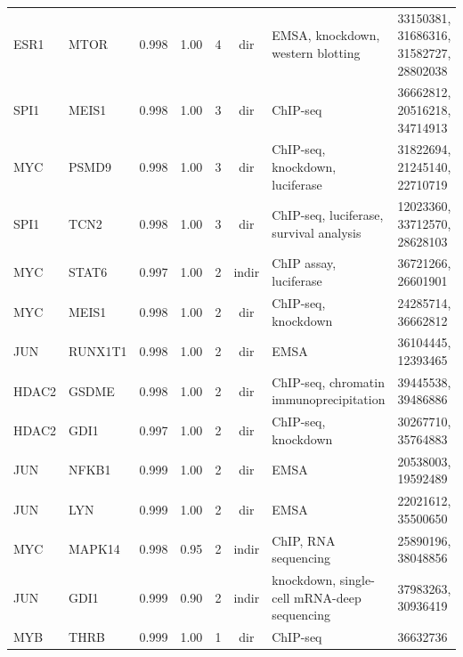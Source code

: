 \documentclass{article}
\begin{document}
\begin{longtable}{llccccP{4.2cm}P{5.8cm}}
ESR1   & MTOR    & 0.998 & 1.00 & 4  & dir   & EMSA, knockdown, western blotting                                              & 33150381, 31686316, 31582727, 28802038 \\
SPI1   & MEIS1   & 0.998 & 1.00 & 3  & dir   & ChIP-seq                                                                       & 36662812, 20516218, 34714913 \\
MYC    & PSMD9   & 0.998 & 1.00 & 3  & dir   & ChIP-seq, knockdown, luciferase                                                & 31822694, 21245140, 22710719 \\
SPI1   & TCN2    & 0.998 & 1.00 & 3  & dir   & ChIP-seq, luciferase, survival analysis                                        & 12023360, 33712570, 28628103 \\
MYC    & STAT6   & 0.997 & 1.00 & 2  & indir & ChIP assay, luciferase                                                         & 36721266, 26601901 \\
MYC    & MEIS1   & 0.998 & 1.00 & 2  & dir   & ChIP-seq, knockdown                                                            & 24285714, 36662812 \\
JUN    & RUNX1T1 & 0.998 & 1.00 & 2  & dir   & EMSA                                                                           & 36104445, 12393465 \\
HDAC2  & GSDME   & 0.998 & 1.00 & 2  & dir   & ChIP-seq, chromatin immunoprecipitation                                        & 39445538, 39486886 \\
HDAC2  & GDI1    & 0.997 & 1.00 & 2  & dir   & ChIP-seq, knockdown                                                            & 30267710, 35764883 \\
JUN    & NFKB1   & 0.999 & 1.00 & 2  & dir   & EMSA                                                                           & 20538003, 19592489 \\
JUN    & LYN     & 0.999 & 1.00 & 2  & dir   & EMSA                                                                           & 22021612, 35500650 \\
MYC    & MAPK14  & 0.998 & 0.95 & 2  & indir & ChIP, RNA sequencing                                                           & 25890196, 38048856 \\
JUN    & GDI1    & 0.999 & 0.90 & 2  & indir & knockdown, single-cell mRNA-deep sequencing                                    & 37983263, 30936419 \\
MYB    & THRB    & 0.999 & 1.00 & 1  & dir   & ChIP-seq                                                                       & 36632736 \\

\end{longtable}
\end{document}
